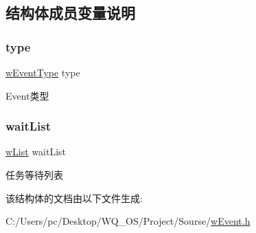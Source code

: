 \subsection{结构体成员变量说明}
\mbox{\label{struct__w_event_ac98b322cb954407564af85e1cbfe18c2}} 
\subsubsection{\texorpdfstring{type}{type}}
{\footnotesize\ttfamily \mbox{\hyperlink{w_event_8h_ab0672c982196a07535850096d01686c6}{w\+Event\+Type}} type}

Event类型 \mbox{\label{struct__w_event_a53d4661687eeb23d08fb0a94ef2918c3}} 
\subsubsection{\texorpdfstring{wait\+List}{waitList}}
{\footnotesize\ttfamily \mbox{\hyperlink{w_lib_8h_a3f922f977222a1e1fc18bd2ce6d668c3}{w\+List}} wait\+List}

任务等待列表 

该结构体的文档由以下文件生成\+:\begin{DoxyCompactItemize}
\item 
C\+:/\+Users/pc/\+Desktop/\+W\+Q\+\_\+\+O\+S/\+Project/\+Sourse/\mbox{\hyperlink{w_event_8h}{w\+Event.\+h}}\end{DoxyCompactItemize}
